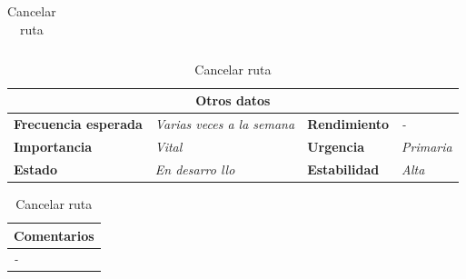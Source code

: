 \documentclass[12pt,spanish]{article}
\begin{document}
\begin{table}[H]
\begin{tabular}{|m{5pt}|m{7.33cm}|m{5pt}|m{7.33cm}|}
		
	\end{tabular}
	
	\vspace{0.5cm}
	
	\begin{tabular}{|m{3.75cm}|m{3.75cm}|m{3.75cm}|m{3.8cm}|}
		\hline
		\multicolumn{4}{|c|}{\textbf{Otros datos}} \\
		\hline
		\textbf{Frecuencia esperada} & \textit{Varias veces a la semana} & \textbf{Rendimiento} & \textit{-} \\
		\hline
		\textbf{Importancia} & \textit{Vital} & \textbf{Urgencia} & \textit{Primaria} \\
		\hline
		\textbf{Estado} & \textit{En desarro
		llo} & \textbf{Estabilidad} & \textit{Alta} \\
		\hline
	\end{tabular}
	
	\vspace{1cm}
	
	\begin{tabular}{|m{16.2cm}|}
		\hline
		\textbf{Comentarios} \\
		\hline
		\textit{-} \\
		\hline
	\end{tabular}
	
	\caption{Cancelar ruta}
	
\end{table}
\end{document}

